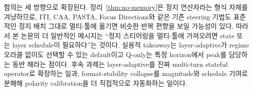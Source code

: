 함의는 세 방향으로 확장된다. 정리~\ref{thm:no-memory}은 정지 연산자라는 형식 자체를 겨냥하므로, ITI, CAA, PASTA, Focus Directions와 같은 기존 steering 기법도 표준적인 정지 배치 그대로 멀티-툴에 옮기면 비슷한 반복 편향을 보일 가능성이 있다. 따라서 본 논문의 더 일반적인 메시지는 ``정지 스티어링을 멀티-툴에 가져오려면 state 또는 layer schedule이 필요하다''는 것이다. 실용적 takeaway는 layer-adaptive가 regime 오라클 없이도 선택할 수 있는 default이고 Q-only는 특정 horizon에서 peak를 담당하는 동반 해라는 점이다. 후속 과제는 layer-adaptive를 진짜 multi-turn stateful operator로 확장하는 일과, format-stability collapse를 magnitude와 schedule 기여로 분해해 polarity calibration을 더 직접적으로 자동화하는 일이다.
